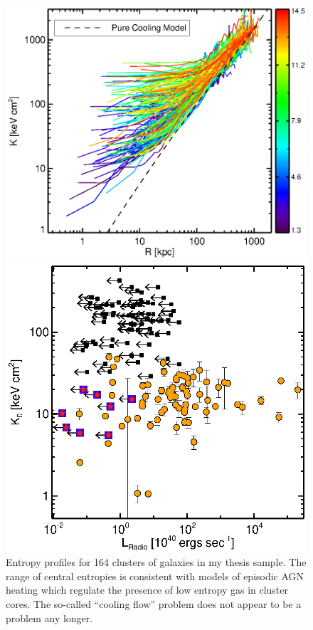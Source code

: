 \documentclass[11pt]{article}
\begin{document}
\clearpage
\begin{figure}[t]
    \begin{minipage}[t]{0.5\linewidth}
        \centering
        \includegraphics*[width=\textwidth, trim=26mm 8mm 30mm 10mm, clip]{splots}
        \caption{\small Entropy profiles for 164 clusters of galaxies
        in my thesis sample. The range of central entropies is
        consistent with models of episodic AGN heating which regulate
        the presence of low entropy gas in cluster cores. The
        so-called ``cooling flow'' problem does not appear to be a problem any
        longer.}
        \label{fig:splots}
    \end{minipage}
    \hspace{0.1in}
    \begin{minipage}[t]{0.5\linewidth}
        \centering
        \includegraphics*[width=\textwidth, trim=28mm 8mm 30mm 10mm, clip]{k0rad}

\end{minipage}
\end{figure}
\end{document}
